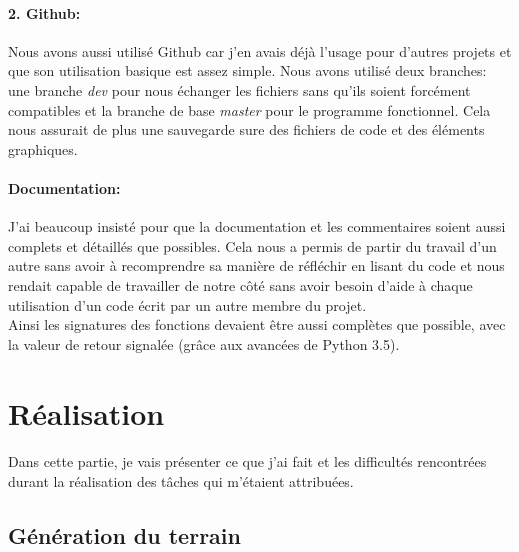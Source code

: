 \documentclass[12pt, a4paper]{article}
\begin{document}
\paragraph{2. Github:}
Nous avons aussi utilisé Github car j'en avais déjà l'usage pour d'autres
projets et que son utilisation basique est assez simple. Nous avons utilisé
deux branches: une branche \emph{dev} pour nous échanger les fichiers sans
qu'ils soient forcément compatibles et la branche de base \emph{master} pour
le programme fonctionnel. Cela nous assurait de plus une sauvegarde sure des
fichiers de code et des éléments graphiques.

\paragraph{Documentation:}
J'ai beaucoup insisté pour que la documentation et les commentaires soient
aussi complets et détaillés que possibles. Cela nous a permis de partir du
travail d'un autre sans avoir à recomprendre sa manière de réfléchir en lisant
du code et nous rendait capable de travailler de notre côté sans avoir besoin
d'aide à chaque utilisation d'un code écrit par un autre membre du projet. \\
Ainsi les signatures des fonctions devaient être aussi complètes que possible,
avec la valeur de retour signalée (grâce aux avancées de Python 3.5).


\newpage

\section{Réalisation}

\paragraph{}
Dans cette partie, je vais présenter ce que j'ai fait et les difficultés
rencontrées durant la réalisation des tâches qui m'étaient attribuées.

\subsection{Génération du terrain}
\end{document}
